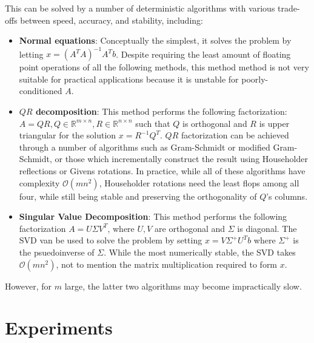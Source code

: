 \documentclass{article}
\newcommand{\bO}{\mathcal{O}}
\begin{document}
This can be solved by a number of deterministic algorithms with various trade-offs between speed, accuracy, and stability, including:
\begin{itemize}
    \item \textbf{Normal equations}:   
        Conceptually the simplest, it solves the problem by letting $x = (A^TA)^{-1}A^Tb$. Despite requiring the least amount of floating point operations of all the following methods, this method method is not very suitable for practical applications because it is unstable for poorly-conditioned $A$.
    \item \textbf{$QR$ decomposition}:
        This method performs the following factorization: $A = QR, Q \in \mathbb{R}^{m \times n}, R \in \mathbb{R}^{n \times n}$ such that $Q$ is orthogonal and $R$ is upper triangular for the solution $x = R^{-1}Q^T$. $QR$ factorization can be achieved through a number of algorithms such as Gram-Schmidt or modified Gram-Schmidt, or those which incrementally construct the result using Householder reflections or Givens rotations. In practice, while all of these algorithms have complexity $\bO(mn^2)$, Householder rotations need the least flops among all four, while still being stable and preserving the orthogonality of $Q$'s columns.
    \item \textbf{Singular Value Decomposition}:
        This method performs the following factorization $A = U \Sigma V^T$, where $U, V$ are orthogonal and $\Sigma$ is diagonal. The SVD van be used to solve the problem by setting $x = V \Sigma^+U^Tb$ where $\Sigma^+$ is the psuedoinverse of $\Sigma$. While the most numerically stable, the SVD takes $\bO(mn^2)$, not to mention the matrix multiplication required to form $x$.
\end{itemize}
However, for $m$ large, the latter two algorithms may become impractically slow.

\section{Experiments}
\end{document}
